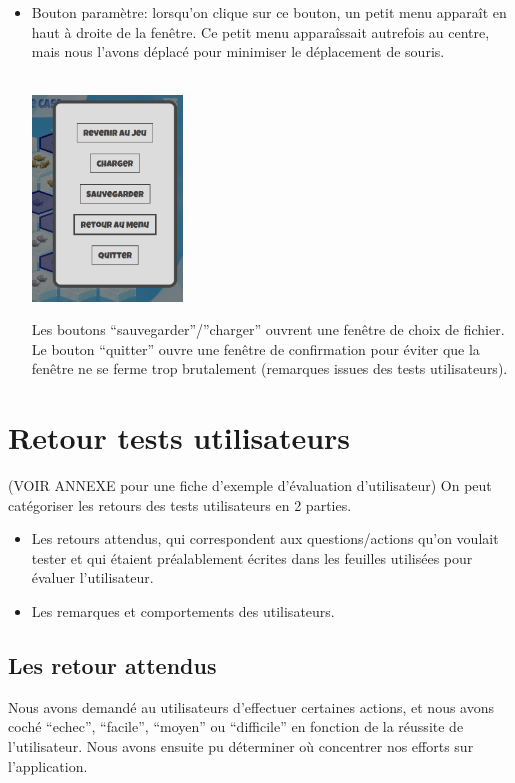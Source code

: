 \documentclass{report}
\begin{document}
\begin{itemize}
\item Bouton paramètre: lorsqu'on clique sur ce bouton, un petit menu apparaît en haut à droite de la fenêtre. Ce petit menu apparaîssait autrefois au centre, mais nous l'avons déplacé pour minimiser le déplacement de souris.
  \\
  \\
\begin{minipage}{0.3\linewidth}
    \includegraphics[width=4cm]{image/parametres.png}    
\end{minipage}\hfill
\begin{minipage}{0.7\linewidth}
    Les boutons ``sauvegarder''/''charger'' ouvrent une fenêtre de choix de fichier. Le bouton ``quitter'' ouvre une fenêtre de confirmation pour éviter que la fenêtre ne se ferme trop brutalement (remarques issues des tests utilisateurs).
  \end{minipage}
\end{itemize}

\section{Retour tests utilisateurs}
(VOIR ANNEXE pour une fiche d'exemple d'évaluation d'utilisateur)
On peut catégoriser les retours des tests utilisateurs en 2 parties.
\begin{itemize}
\item Les retours attendus, qui correspondent aux questions/actions qu'on voulait tester et qui étaient préalablement écrites dans les feuilles utilisées pour évaluer l'utilisateur.
\item Les remarques et comportements des  utilisateurs.
\end{itemize}

\subsection{Les retour attendus}
Nous avons demandé au utilisateurs d'effectuer certaines actions, et nous avons coché ``echec'', ``facile'', ``moyen'' ou  ``difficile'' en fonction de la réussite de l'utilisateur. Nous avons ensuite pu déterminer où concentrer nos efforts sur l'application.
\end{document}
